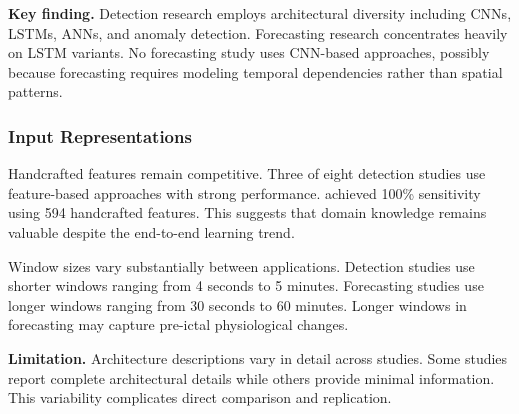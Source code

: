 \textbf{Key finding.} Detection research employs architectural diversity including CNNs, LSTMs, ANNs, and anomaly detection. Forecasting research concentrates heavily on LSTM variants. No forecasting study uses CNN-based approaches, possibly because forecasting requires modeling temporal dependencies rather than spatial patterns.

\subsubsection{Input Representations}

Handcrafted features remain competitive. Three of eight detection studies use feature-based approaches with strong performance. \textcite{fineWearableDeviceSeizure2025} achieved 100\% sensitivity using 594 handcrafted features. This suggests that domain knowledge remains valuable despite the end-to-end learning trend.

Window sizes vary substantially between applications. Detection studies use shorter windows ranging from 4 seconds to 5 minutes. Forecasting studies use longer windows ranging from 30 seconds to 60 minutes. Longer windows in forecasting may capture pre-ictal physiological changes.

\textbf{Limitation.} Architecture descriptions vary in detail across studies. Some studies report complete architectural details while others provide minimal information. This variability complicates direct comparison and replication.

